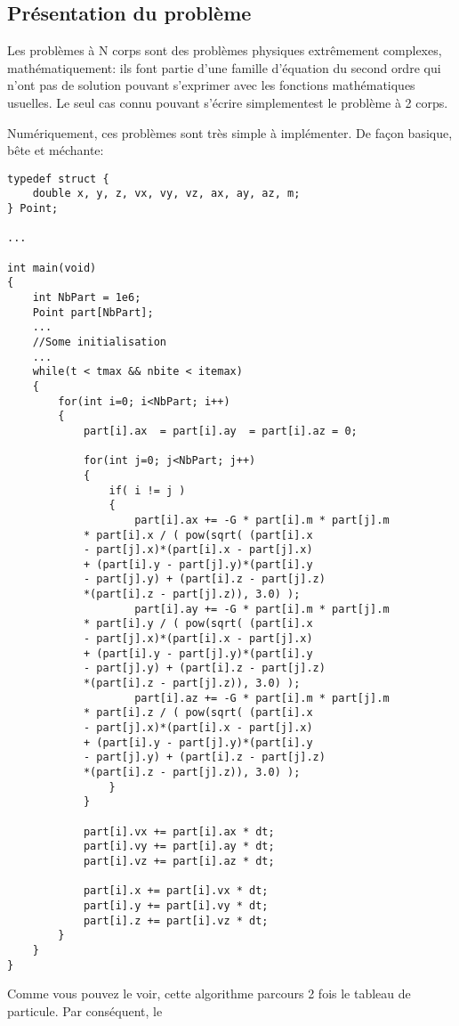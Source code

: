 \subsection{Présentation du problème}
	Les problèmes à N corps sont des problèmes physiques extrêmement complexes, mathématiquement: ils font partie d'une
	famille d'équation du second ordre qui n'ont pas de solution pouvant s'exprimer avec les fonctions mathématiques
	usuelles. Le seul cas connu pouvant s'écrire \og simplement\fg est le problème à 2 corps.

	Numériquement, ces problèmes sont très simple à implémenter. De façon basique, bête et méchante:
	\lstset{language=C, label=algo::NBodySimple, frame=shadowbox}
	\begin{lstlisting}
typedef struct {
    double x, y, z, vx, vy, vz, ax, ay, az, m;
} Point;

...

int main(void)
{
    int NbPart = 1e6;
    Point part[NbPart];
    ...
    //Some initialisation
    ...
    while(t < tmax && nbite < itemax)
    {
        for(int i=0; i<NbPart; i++)
        {
            part[i].ax  = part[i].ay  = part[i].az = 0;

            for(int j=0; j<NbPart; j++)
            {
                if( i != j )
                {
                    part[i].ax += -G * part[i].m * part[j].m
			* part[i].x / ( pow(sqrt( (part[i].x
			- part[j].x)*(part[i].x - part[j].x)
			+ (part[i].y - part[j].y)*(part[i].y
			- part[j].y) + (part[i].z - part[j].z)
			*(part[i].z - part[j].z)), 3.0) );
                    part[i].ay += -G * part[i].m * part[j].m
			* part[i].y / ( pow(sqrt( (part[i].x
			- part[j].x)*(part[i].x - part[j].x)
			+ (part[i].y - part[j].y)*(part[i].y
			- part[j].y) + (part[i].z - part[j].z)
			*(part[i].z - part[j].z)), 3.0) );
                    part[i].az += -G * part[i].m * part[j].m
			* part[i].z / ( pow(sqrt( (part[i].x
			- part[j].x)*(part[i].x - part[j].x)
			+ (part[i].y - part[j].y)*(part[i].y
			- part[j].y) + (part[i].z - part[j].z)
			*(part[i].z - part[j].z)), 3.0) );
                }
            }

            part[i].vx += part[i].ax * dt;
            part[i].vy += part[i].ay * dt;
            part[i].vz += part[i].az * dt;

            part[i].x += part[i].vx * dt;
            part[i].y += part[i].vy * dt;
            part[i].z += part[i].vz * dt;
        }
    }
}
	\end{lstlisting}
	Comme vous pouvez le voir, cette algorithme parcours 2 fois le tableau de particule. Par conséquent, le

